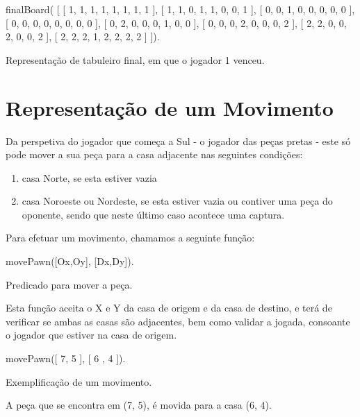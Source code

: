 \documentclass[15pt,a4paper]{article}
\begin{document}
\begin{code}[H]
	\begin{verbatimtab}

finalBoard(
	[
		[ 1, 1, 1, 1, 1, 1, 1, 1 ],
		[ 1, 1, 0, 1, 1, 0, 0, 1 ],
		[ 0, 0, 1, 0, 0, 0, 0, 0 ],
		[ 0, 0, 0, 0, 0, 0, 0, 0 ],
		[ 0, 2, 0, 0, 0, 1, 0, 0 ],
		[ 0, 0, 0, 2, 0, 0, 0, 2 ],
		[ 2, 2, 0, 0, 2, 0, 0, 2 ],
		[ 2, 2, 2, 1, 2, 2, 2, 2 ]
	]).
\end{verbatimtab}
\caption{Representação de tabuleiro final, em que o jogador 1 venceu.}
\end{code}


\newpage

\section{Representação de um Movimento}


Da perspetiva do jogador que começa a Sul - o jogador das peças pretas - este só pode mover a sua peça para a casa adjacente nas seguintes condições:
\begin{enumerate}
\item casa Norte, se esta estiver vazia
\item casa Noroeste ou Nordeste, se esta estiver vazia ou contiver uma peça do oponente, sendo que neste último caso acontece uma captura.
\end{enumerate}
Para efetuar um movimento, chamamos a seguinte função:
\begin{code}[H]
	\begin{verbatimtab}

	movePawn([Ox,Oy], [Dx,Dy]).
\end{verbatimtab}
\caption{Predicado para mover a peça.}
\end{code}
Esta função aceita o X e Y da casa de origem e da casa de destino, e terá de verificar se ambas as casas são adjacentes, bem como validar a jogada, consoante o jogador que estiver na casa de origem.

\begin{code}[H]
	\begin{verbatimtab}

	movePawn([ 7, 5 ], [ 6 , 4 ]).
\end{verbatimtab}
\caption{Exemplificação de um movimento.}
\end{code}
A peça que se encontra em (7, 5), é movida para a casa (6, 4).
\end{document}
